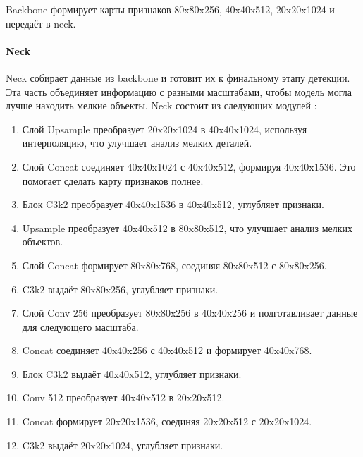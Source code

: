 Backbone формирует карты признаков 80x80x256, 40x40x512, 20x20x1024 и передаёт  в neck.

\paragraph{Neck}

Neck собирает данные из backbone и готовит их к финальному этапу детекции. Эта часть объединяет информацию с разными масштабами, чтобы модель могла лучше находить мелкие объекты. Neck состоит из следующих модулей \cite{yolo3}:

\begin{enumerate}
	\item Слой Upsample преобразует 20x20x1024 в 40x40x1024, используя интерполяцию, что улучшает анализ мелких деталей.
	
	\item Слой Concat соединяет 40x40x1024 с 40x40x512, формируя 40x40x1536. Это помогает сделать карту признаков полнее.  

	\item Блок C3k2 преобразует 40x40x1536 в 40x40x512, углубляет признаки.
	
	\item Upsample преобразует 40x40x512 в 80x80x512, что улучшает анализ мелких объектов.
	
	\item Слой Concat формирует 80x80x768, соединяя 80x80x512 с 80x80x256.
	
	\item C3k2 выдаёт 80x80x256, углубляет признаки.
	
	\item Слой Conv 256 преобразует 80x80x256 в 40x40x256 и подготавливает данные для следующего масштаба.
	
	\item Concat соединяет 40x40x256 с 40x40x512 и формирует 40x40x768.
	
	\item Блок C3k2 выдаёт 40x40x512, углубляет признаки.
	
	\item Conv 512 преобразует 40x40x512 в 20x20x512.
	
	\item Concat формирует 20x20x1536, соединяя 20x20x512 с 20x20x1024. 
	
	\item C3k2 выдаёт 20x20x1024, углубляет признаки.

\end{enumerate}

